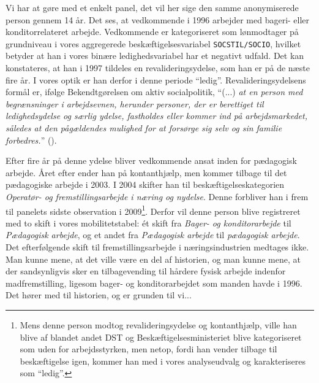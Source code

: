 %
Vi har at gøre med et enkelt panel, det vil her sige den samme anonymiserede person gennem 14 år. Det ses, at vedkommende i 1996 arbejder med bageri- eller konditorrelateret arbejde. Vedkommende er kategoriseret som lønmodtager på grundniveau i vores aggregerede beskæftigelsesvariabel \texttt{SOCSTIL/SOCIO}, hvilket betyder at han i vores binære ledighedsvariabel har et negativt udfald. Det kan konstateres, at han i 1997 tildeles en revalideringsydelse, som han er på de næste fire år. I vores optik er han derfor i denne periode “ledig”. Revalideringsydelsens formål er, ifølge Bekendtgørelsen om aktiv socialpolitik, “(...) \emph{at en person med begrænsninger i arbejdsevnen, herunder personer, der er berettiget til ledighedsydelse og særlig ydelse, fastholdes eller kommer ind på arbejdsmarkedet, således at den pågældendes mulighed for at forsørge sig selv og sin familie forbedres.}” (\textcite{lov_revalidering}).

Efter fire år på denne ydelse bliver vedkommende ansat inden for pædagogisk arbejde.  Året efter ender han på kontanthjælp, men kommer tilbage til det pædagogiske arbejde i 2003. I 2004 skifter han til beskæftigelseskategorien \emph{Operatør- og fremstillingsarbejde i næring og nydelse}. Denne forbliver han i frem til panelets sidste observation i 2009\footnote{Mens denne person modtog revalideringsydelse og kontanthjælp, ville han blive af blandet andet DST og Beskæftigelsesministeriet blive kategoriseret som uden for arbejdsstyrken, men netop, fordi han vender tilbage til beskæftigelse igen, kommer han med i vores analyseudvalg og karakteriseres som “ledig”.}. Derfor vil denne person blive registreret med to skift i vores mobilitetstabel: ét skift fra \emph{Bager- og konditorarbejde} til \emph{Pædagogisk arbejde}, og et andet fra \emph{Pædagogisk arbejde} til \emph{pædagogisk arbejde}. Det efterfølgende skift til fremstillingsarbejde i næringsindustrien medtages ikke. Man kunne mene, at det ville være en del af historien, og man kunne mene, at der sandsynligvis sker en tilbagevending til hårdere fysisk arbejde indenfor madfremstilling, ligesom bager- og konditorarbejdet som manden havde i 1996. Det hører med til historien, og er grunden til vi... %

